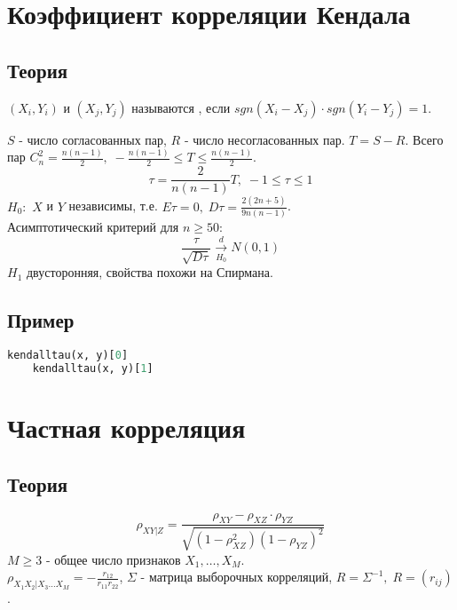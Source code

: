 \section{Коэффициент корреляции Кендала}\label{cha:corr/sec:kendal}

\subsection*{Теория}\label{cha:corr/sec:kendal/subsec:theory}

\begin{definition}\label{lec:corr/def:1}
	$(X_i, Y_i)$ и $(X_j, Y_j)$ называются , если $sgn (X_i - X_j) \cdot sgn (Y_i - Y_j) = 1$.
\end{definition}

$S$ - число согласованных пар, $R$ - число несогласованных пар. $T = S - R$. Всего пар $C_n^2 = \frac{n(n-1)}{2}, \; -\frac{n(n-1)}{2} \le T \le \frac{n(n-1)}{2}$.
$$\tau = \frac{2}{n(n-1)}T, \; -1 \le \tau \le 1$$
$H_0:$ $X$ и $Y$ независимы, т.е. $E \tau = 0, \; D \tau = \frac{2(2n+5)}{9n (n-1)}$.\\

Асимптотический критерий для $n \ge 50$:
$$\frac{\tau}{\sqrt{D \tau}} \xrightarrow[H_0]{d} N(0,1)$$
$H_1$ двусторонняя, свойства похожи на Спирмана.

\subsection*{Пример}\label{cha:corr/sec:kendal/subsec:prob}

\begin{lstlisting}[language=Python]
	kendalltau(x, y)[0]
	kendalltau(x, y)[1]
\end{lstlisting}

\section{Частная корреляция}\label{cha:corr/sec:chast}

\subsection*{Теория}\label{cha:corr/sec:chast/subsec:theory}

$$\rho_{XY|Z} = \frac{\rho_{XY} - \rho_{XZ} \cdot \rho_{YZ}}{\sqrt{(1-\rho_{XZ}^2)(1-\rho_{YZ})^2}}$$
$M \ge 3$ - общее число признаков $X_1, \dots, X_M$.\\
$\rho_{X_1 X_2 | X_3 \dots X_M} = -\frac{r_{12}}{r_{11} r_{22}}$, $\Sigma$ - матрица выборочных корреляций, $R = \Sigma^{-1}, \; R = (r_{ij})$.\\

